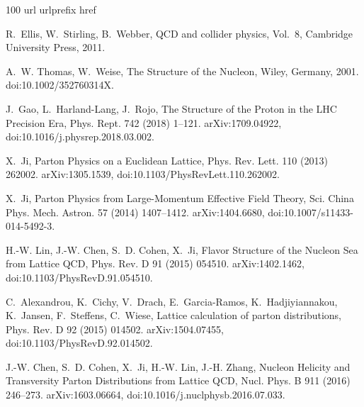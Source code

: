\begin{thebibliography}{100}
\expandafter\ifx\csname url\endcsname\relax
  \def\url#1{\texttt{#1}}\fi
\expandafter\ifx\csname urlprefix\endcsname\relax\def\urlprefix{URL }\fi
\expandafter\ifx\csname href\endcsname\relax
  \def\href#1#2{#2} \def\path#1{#1}\fi

R.~Ellis, W.~Stirling, B.~Webber, {QCD and collider physics}, Vol.~8, Cambridge
  University Press, 2011.

A.~W. Thomas, W.~Weise, {The Structure of the Nucleon}, Wiley, Germany, 2001.
\newblock \href {https://doi.org/10.1002/352760314X}
  {\path{doi:10.1002/352760314X}}.

J.~Gao, L.~Harland-Lang, J.~Rojo, {The Structure of the Proton in the LHC
  Precision Era}, Phys. Rept. 742 (2018) 1--121.
\newblock \href {http://arxiv.org/abs/1709.04922} {\path{arXiv:1709.04922}},
  \href {https://doi.org/10.1016/j.physrep.2018.03.002}
  {\path{doi:10.1016/j.physrep.2018.03.002}}.

X.~Ji, {Parton Physics on a Euclidean Lattice}, Phys. Rev. Lett. 110 (2013)
  262002.
\newblock \href {http://arxiv.org/abs/1305.1539} {\path{arXiv:1305.1539}},
  \href {https://doi.org/10.1103/PhysRevLett.110.262002}
  {\path{doi:10.1103/PhysRevLett.110.262002}}.

X.~Ji, {Parton Physics from Large-Momentum Effective Field Theory}, Sci. China
  Phys. Mech. Astron. 57 (2014) 1407--1412.
\newblock \href {http://arxiv.org/abs/1404.6680} {\path{arXiv:1404.6680}},
  \href {https://doi.org/10.1007/s11433-014-5492-3}
  {\path{doi:10.1007/s11433-014-5492-3}}.

H.-W. Lin, J.-W. Chen, S.~D. Cohen, X.~Ji, {Flavor Structure of the Nucleon Sea
  from Lattice QCD}, Phys. Rev. D 91 (2015) 054510.
\newblock \href {http://arxiv.org/abs/1402.1462} {\path{arXiv:1402.1462}},
  \href {https://doi.org/10.1103/PhysRevD.91.054510}
  {\path{doi:10.1103/PhysRevD.91.054510}}.

C.~Alexandrou, K.~Cichy, V.~Drach, E.~Garcia-Ramos, K.~Hadjiyiannakou,
  K.~Jansen, F.~Steffens, C.~Wiese, {Lattice calculation of parton
  distributions}, Phys. Rev. D 92 (2015) 014502.
\newblock \href {http://arxiv.org/abs/1504.07455} {\path{arXiv:1504.07455}},
  \href {https://doi.org/10.1103/PhysRevD.92.014502}
  {\path{doi:10.1103/PhysRevD.92.014502}}.

J.-W. Chen, S.~D. Cohen, X.~Ji, H.-W. Lin, J.-H. Zhang, {Nucleon Helicity and
  Transversity Parton Distributions from Lattice QCD}, Nucl. Phys. B 911 (2016)
  246--273.
\newblock \href {http://arxiv.org/abs/1603.06664} {\path{arXiv:1603.06664}},
  \href {https://doi.org/10.1016/j.nuclphysb.2016.07.033}
  {\path{doi:10.1016/j.nuclphysb.2016.07.033}}.


\end{thebibliography}
